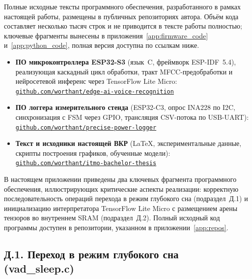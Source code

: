 Полные исходные тексты программного обеспечения, разработанного
в рамках настоящей работы, размещены в публичных репозиториях
автора. Объём кода составляет несколько тысяч строк и не
приводится в тексте работы полностью; ключевые фрагменты
вынесены в приложения~\ref{app:firmware_code}
и~\ref{app:python_code}, полная версия доступна по ссылкам ниже.

\begin{itemize}
	\item \textbf{ПО микроконтроллера ESP32-S3} (язык~C,
	      фреймворк ESP-IDF~5.4), реализующая каскадный цикл
	      обработки, тракт MFCC-предобработки и нейросетевой
	      инференс через TensorFlow Lite Micro:
	      \\
	      \href{https://github.com/worthant/edge-ai-voice-recognition}%
	      {\texttt{github.com/worthant/edge-ai-voice-recognition}}

	\item \textbf{ПО логгера измерительного стенда}
	      (ESP32-C3, опрос INA228 по I2C, синхронизация с FSM
	      через GPIO, трансляция CSV-потока по USB-UART):
	      \\
	      \href{https://github.com/worthant/precise-power-logger}%
	      {\texttt{github.com/worthant/precise-power-logger}}

	\item \textbf{Текст и исходники настоящей ВКР} (LaTeX,
	      экспериментальные данные, скрипты построения графиков,
	      обученные модели):
	      \\
	      \href{https://github.com/worthant/itmo-bachelor-thesis}%
	      {\texttt{github.com/worthant/itmo-bachelor-thesis}}
\end{itemize}

\label{app:firmware_code}

В настоящем приложении приведены два ключевых фрагмента
программного обеспечения, иллюстрирующих критические аспекты реализации:
корректную последовательность операций перехода в режим
глубокого сна (подраздел~Д.1) и инициализацию интерпретатора
TensorFlow Lite Micro с размещением арены тензоров во
внутреннем SRAM (подраздел~Д.2). Полный исходный код программы
доступен в репозитории, указанном в приложении~\ref{app:repos}.

\subsection*{Д.1. Переход в режим глубокого сна (vad\_sleep.c)}


